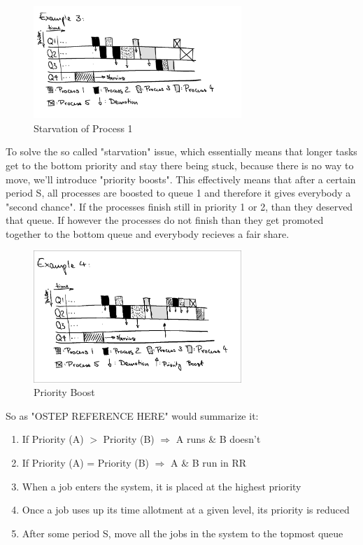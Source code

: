 \documentclass{report}
\begin{document}
\begin{figure}[h]
  \begin{center}
    \includegraphics[width=0.7\textwidth]{assets/mlfq-diag-3.png}
    \caption{Starvation of Process 1}
    \label{mlfq-diag-3}
  \end{center}
\end{figure}

To solve the so called "starvation" issue, which essentially means that longer tasks get to the bottom priority and stay there being stuck, because there is no way to move, we'll introduce "priority boosts".
This effectively means that after a certain period S, all processes are boosted to queue 1 and therefore it gives everybody a "second chance". If the processes finish still in priority 1 or 2, than they deserved that queue.
If however the processes do not finish than they get promoted together to the bottom queue and everybody recieves a fair share.

\begin{figure}[h]
  \begin{center}
    \includegraphics[width=0.7\textwidth]{assets/mlfq-diag-4.png}
    \caption{Priority Boost}
    \label{mlfq-diag-4}
  \end{center}
\end{figure}

\noindent So as "OSTEP REFERENCE HERE" would summarize it: %
\begin{enumerate}
  \item If Priority (A) $>$ Priority (B) $\Rightarrow$ A runs \& B doesn't
  \item If Priority (A) = Priority (B) $\Rightarrow$ A \& B run in RR
  \item When a job enters the system, it is placed at the highest priority
  \item Once a job uses up its time allotment at a given level, its priority is reduced
  \item After some period S, move all the jobs in the system to the topmost queue
\end{enumerate}
\end{document}
